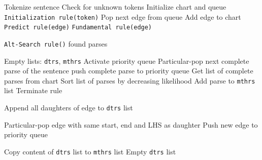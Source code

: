 \documentclass[11pt, titlepage, a4paper]{scrartcl}		%
\newcommand{\XMas}[1]{Alt-Search#1}
\begin{document}
\begin{algorithm}
\caption{Bottom-Up Parsing Algorithm with \XMas{} Extension}
\label{alg:alt}
\begin{algorithmic}[1]
\STATE Tokenize sentence
\STATE Check for unknown tokens
\STATE Initialize chart and queue
    \STATE \texttt{Initialization rule(token)}
\ENDFOR
{} \label{alg:alt:parse:start}
    \STATE Pop next edge from queue
    \STATE Add edge to chart
        \STATE \texttt{Predict rule(edge)}
    \ENDIF
    \STATE \texttt{Fundamental rule(edge)}

        \STATE \texttt{\XMas{} rule()}
    \ENDIF
\ENDWHILE  \label{alg:alt:parse:end}
\RETURN found parses
\end{algorithmic}
\end{algorithm}

\begin{algorithm}
\caption{\XMas{} Rule}
\label{alg:alt:rule}
\begin{algorithmic}[1]
\REQUIRE Empty lists: \texttt{dtrs}, \texttt{mthrs}
\STATE Activate priority queue \label{alg:alt:rule:activate}
\STATE Particular-pop next complete parse of the sentence  \label{alg:alt:rule:altparse:start}
    \STATE push complete parse to priority queue  \label{alg:alt:rule:altparse:end}
    \STATE Get list of complete parses from chart  \label{alg:alt:rule:s-dtrs}
    \STATE Sort list of parses by decreasing likelihood
        \STATE Add parse to \texttt{mthrs} list
                \STATE Terminate rule
            \ENDIF

                \STATE Append all daughters of edge to \texttt{dtrs} list
            \ENDFOR

                \REPEAT
                    \STATE Particular-pop edge with same start, end and LHS as daughter
                    \STATE Push new edge to priority queue    
            \ENDFOR

            \STATE Copy content of \texttt{dtrs} list to \texttt{mthrs} list
            \STATE Empty \texttt{dtrs} list
        \ENDWHILE
    \ENDFOR
\ENDIF
\end{algorithmic}
\end{algorithm}
\end{document}
